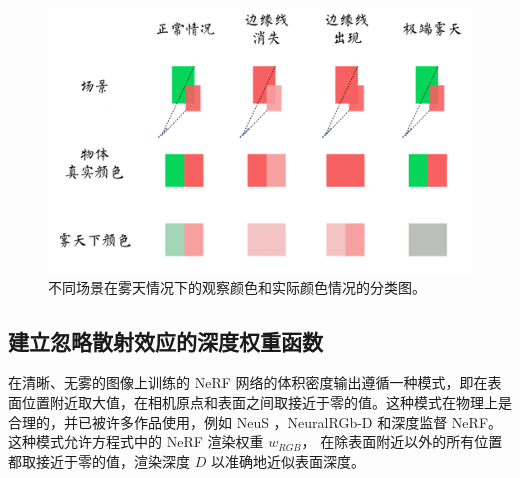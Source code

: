 \begin{figure}[ht]
    \centering
    \includegraphics[width=\textwidth]{undergraduate-thesis/images/dehazing-nerf/taxonomy.pdf}
    \caption{不同场景在雾天情况下的观察颜色和实际颜色情况的分类图。}
    \label{fig:dehazing-nerf taxonomy}
\end{figure}

\subsection{建立忽略散射效应的深度权重函数}
在清晰、无雾的图像上训练的 NeRF 网络的体积密度输出遵循一种模式，即在表面位置附近取大值，在相机原点和表面之间取接近于零的值。这种模式在物理上是合理的，并已被许多作品使用，例如 NeuS \cite{wang_neus_2021}，NeuralRGb-D\cite{azinovic_neural_2022} 和深度监督 NeRF\cite{deng_depth-supervised_2022}。这种模式允许方程式中的 NeRF 渲染权重 $w_{RGB}$， 在除表面附近以外的所有位置都取接近于零的值，渲染深度 $D$ 以准确地近似表面深度。

